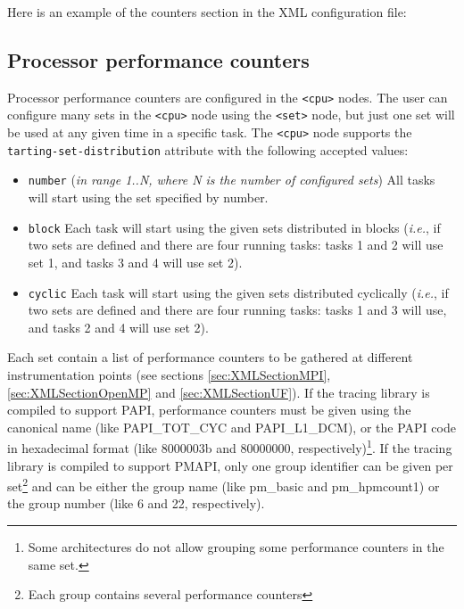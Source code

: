 Here is an example of the counters section in the XML configuration file:




\subsection{Processor performance counters}\label{subsec:ProcessorPerformanceCounters}

Processor performance counters are configured in the {\tt <cpu>} nodes. The user can configure many sets in the {\tt <cpu>} node using the {\tt <set>} node, but just one set will be used at any given time in a specific task. The {\tt <cpu>} node supports the {\tt tarting-set-distribution} attribute with the following accepted values:

\begin{itemize}
 \item {\tt number} ({\em in range 1..N, where N is the number of configured sets}) All tasks will start using the set specified by number.
 \item {\tt block} Each task will start using the given sets distributed in blocks ({\em i.e.}, if two sets are defined and there are four running tasks: tasks 1 and 2 will use set 1, and tasks 3 and 4 will use set 2).
 \item {\tt cyclic} Each task will start using the given sets distributed cyclically ({\em i.e.}, if two sets are defined and there are four running tasks: tasks 1 and 3 will use, and tasks 2 and 4 will use set 2).
\end{itemize}

Each set contain a list of performance counters to be gathered at different instrumentation points (see sections \ref{sec:XMLSectionMPI}, \ref{sec:XMLSectionOpenMP} and \ref{sec:XMLSectionUF}). If the tracing library is compiled to support PAPI, performance counters must be given using the canonical name (like PAPI\_TOT\_CYC and PAPI\_L1\_DCM), or the PAPI code in hexadecimal format (like 8000003b and 80000000, respectively)\footnote{Some architectures do not allow grouping some performance counters in the same set.}. If the tracing library is compiled to support PMAPI, only one group identifier can be given per set\footnote{Each group contains several performance counters} and can be either the group name (like pm\_basic and pm\_hpmcount1) or the group number (like 6 and 22, respectively). 

